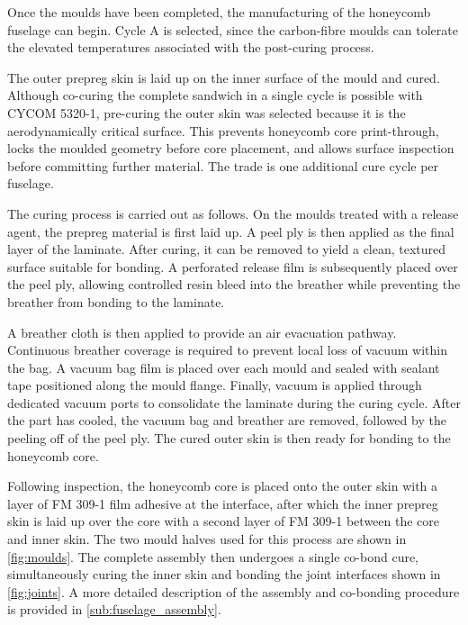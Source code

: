 Once the moulds have been completed, the manufacturing of the honeycomb fuselage can begin. Cycle A is selected, since the carbon-fibre moulds can tolerate the elevated temperatures associated with the post-curing process.

The outer prepreg skin is laid up on the inner surface of the mould and cured. Although co-curing the complete sandwich in a single cycle is possible with CYCOM 5320-1, pre-curing the outer skin was selected because it is the aerodynamically critical surface. This prevents honeycomb core print-through, locks the moulded geometry before core placement, and allows surface inspection before committing further material. The trade is one additional cure cycle per fuselage. 

The curing process is carried out as follows. On the moulds treated with a release agent, the prepreg material is first laid up. A peel ply is then applied as the final layer of the laminate. After curing, it can be removed to yield a clean, textured surface suitable for bonding. A perforated release film is subsequently placed over the peel ply, allowing controlled resin bleed into the breather while preventing the breather from bonding to the laminate.

A breather cloth is then applied to provide an air evacuation pathway. Continuous breather coverage is required to prevent local loss of vacuum within the bag. A vacuum bag film is placed over each mould and sealed with sealant tape positioned along the mould flange. Finally, vacuum is applied through dedicated vacuum ports to consolidate the laminate during the curing cycle. After the part has cooled, the vacuum bag and breather are removed, followed by the peeling off of the peel ply. The cured outer skin is then ready for bonding to the honeycomb core. %

Following inspection, the honeycomb core is placed onto the outer skin with a layer of FM 309-1 film adhesive at the interface, after which the inner prepreg skin is laid up over the core with a second layer of FM 309-1 between the core and inner skin. The two mould halves used for this process are shown in \autoref{fig:moulds}. The complete assembly then undergoes a single co-bond cure, simultaneously curing the inner skin and bonding the joint interfaces shown in \autoref{fig:joints}. A more detailed description of the assembly and co-bonding procedure is provided in \autoref{sub:fuselage_assembly}.

